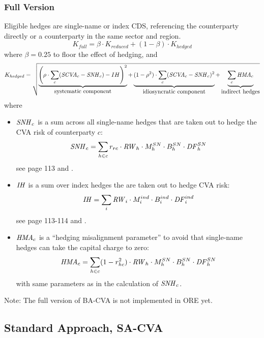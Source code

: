 \subsubsection{Full Version}\label{sssec_bacva_full}

Eligible hedges are single-name or index CDS, referencing the counterparty directly or a counterparty in the same sector and region.
$$
K_{full} = \beta\cdot K_{reduced} + (1-\beta)\cdot K_{hedged}
$$
where $\beta=0.25$ to floor the effect of hedging, and
$$
K_{hedged} = \sqrt{\underbrace{\left(\rho\cdot\sum_c(\mathit{SCVA}_c -\mathit{SNH}_c)- IH\right)^2}_{\mbox{systematic component}} + \underbrace{(1-\rho^2)\cdot\sum_c (\mathit{SCVA}_c -\mathit{SNH}_c)^2}_{\mbox{idiosyncratic component}} + \underbrace{\sum_c \mathit{HMA}_c}_{\mbox{indirect hedges}} }
$$
where
\begin{itemize}
\item $\mathit{SNH}_c$ is a sum across all single-name hedges that are taken out to hedge the CVA risk of counterparty $c$:
$$
\mathit{SNH}_c = \sum_{h\in c} r_{rc}\cdot \mathit{RW}_h \cdot M^{SN}_h\cdot B^{SN}_h\cdot \mathit{DF}^{SN}_h
$$
see \cite{d424} page 113 and \cite{d507}.
\item $\mathit{IH}$ is a sum over index hedges the are taken out to hedge CVA risk:
$$
\mathit{IH} = \sum_i \mathit{RW}_i\cdot M^{ind}_i\cdot B^{ind}_i\cdot \mathit{DF}^{ind}_i
$$
see \cite{d424} page 113-114 and \cite{d507}.
\item $\mathit{HMA}_c$ is a ``hedging misalignment parameter'' to avoid that single-name hedges can take the capital charge to zero:
$$
\mathit{HMA}_c = \sum_{h\in c} (1- r_{hc}^2)\cdot \mathit{RW}_h \cdot M^{SN}_h\cdot B^{SN}_h\cdot \mathit{DF}^{SN}_h
$$
with same parameters as in the calculation of $\mathit{SNH}_c$.
\end{itemize}

Note: The full version of BA-CVA is not implemented in ORE yet.

\ifdefined\MethodologyOnly{}\fi %

\subsection{Standard Approach, SA-CVA}\label{sec:sa-cva}

